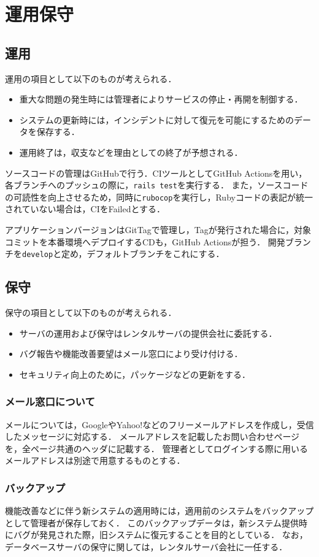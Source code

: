\chapter{運用保守}
\section{運用}
運用の項目として以下のものが考えられる．
\begin{itemize}
	\item 重大な問題の発生時には管理者によりサービスの停止・再開を制御する．
	\item システムの更新時には，インシデントに対して復元を可能にするためのデータを保存する．
	\item 運用終了は，収支などを理由としての終了が予想される．
\end{itemize}
ソースコードの管理はGitHubで行う．CIツールとしてGitHub Actionsを用い，各ブランチへのプッシュの際に，\texttt{rails test}を実行する．
また，ソースコードの可読性を向上させるため，同時に\texttt{rubocop}を実行し，Rubyコードの表記が統一されていない場合は，CIをFailedとする．\par
アプリケーションバージョンはGitTagで管理し，Tagが発行された場合に，対象コミットを本番環境へデプロイするCDも，GitHub Actionsが担う．
開発ブランチを\texttt{develop}と定め，デフォルトブランチをこれにする．
\section{保守}
保守の項目として以下のものが考えられる．
\begin{itemize}
	\item サーバの運用および保守はレンタルサーバの提供会社に委託する．
	\item バグ報告や機能改善要望はメール窓口により受け付ける．
	\item セキュリティ向上のために，パッケージなどの更新をする．
\end{itemize}
\subsection*{メール窓口について}
メールについては，GoogleやYahoo!などのフリーメールアドレスを作成し，受信したメッセージに対応する．
メールアドレスを記載したお問い合わせページを，全ページ共通のヘッダに記載する．
管理者としてログインする際に用いるメールアドレスは別途で用意するものとする．
\subsection*{バックアップ}
機能改善などに伴う新システムの適用時には，適用前のシステムをバックアップとして管理者が保存しておく．
このバックアップデータは，新システム提供時にバグが発見された際，旧システムに復元することを目的としている．
なお，データベースサーバの保守に関しては，レンタルサーバ会社に一任する．
